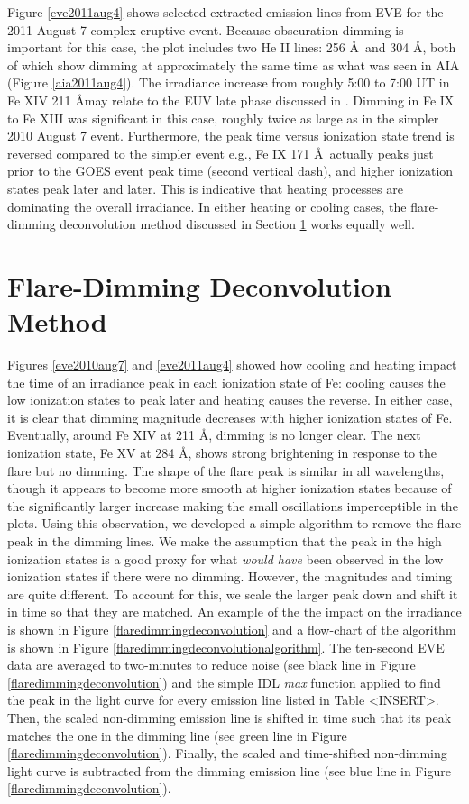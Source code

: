 Figure \ref{eve2011aug4} shows selected extracted emission lines from EVE for the 2011 August 7 complex eruptive event. Because obscuration dimming is important for this case, the plot includes two He II lines: 256 \AA\ and 304 \AA, both of which show dimming at approximately the same time as what was seen in AIA (Figure \ref{aia2011aug4}). The irradiance increase from roughly 5:00 to 7:00 UT in Fe XIV 211 \AA may relate to the EUV late phase discussed in \citet{Woods2011}. Dimming in Fe IX to Fe XIII was significant in this case, roughly twice as large as in the simpler 2010 August 7 event. Furthermore, the peak time versus ionization state trend is reversed compared to the simpler event e.g., Fe IX 171 \AA\ actually peaks just prior to the GOES event peak time (second vertical dash), and higher ionization states peak later and later. This is indicative that heating processes are dominating the overall irradiance. In either heating or cooling cases, the flare-dimming deconvolution method discussed in Section \ref{sec:deconvolve} works equally well. 

\section{Flare-Dimming Deconvolution Method}
\label{sec:deconvolve}
Figures \ref{eve2010aug7} and \ref{eve2011aug4} showed how cooling and heating impact the time of an irradiance peak in each ionization state of Fe: cooling causes the low ionization states to peak later and heating causes the reverse. In either case, it is clear that dimming magnitude decreases with higher ionization states of Fe. Eventually, around Fe XIV at 211 \AA, dimming is no longer clear. The next ionization state, Fe XV at 284 \AA, shows strong brightening in response to the flare but no dimming. The shape of the flare peak is similar in all wavelengths, though it appears to become more smooth at higher ionization states because of the significantly larger increase making the small oscillations imperceptible in the plots. Using this observation, we developed a simple algorithm to remove the flare peak in the dimming lines. We make the assumption that the peak in the high ionization states is a good proxy for what \textit{would have} been observed in the low ionization states if there were no dimming. However, the magnitudes and timing are quite different. To account for this, we scale the larger peak down and shift it in time so that they are matched. An example of the the impact on the irradiance is shown in Figure \ref{flaredimmingdeconvolution} and a flow-chart of the algorithm is shown in Figure \ref{flaredimmingdeconvolutionalgorithm}. The ten-second EVE data are averaged to two-minutes to reduce noise (see black line in Figure \ref{flaredimmingdeconvolution}) and the simple IDL \textit{max} function applied to find the peak in the light curve for every emission line listed in Table <INSERT>. Then, the scaled non-dimming emission line is shifted in time such that its peak matches the one in the dimming line (see green line in Figure \ref{flaredimmingdeconvolution}). Finally, the scaled and time-shifted non-dimming light curve is subtracted from the dimming emission line (see blue line in Figure \ref{flaredimmingdeconvolution}). 

